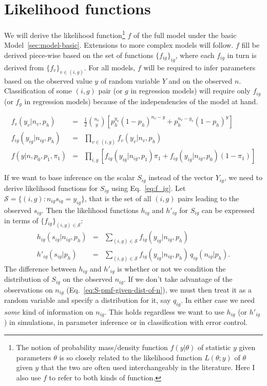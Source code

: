 \documentclass[letterpaper]{article}
\begin{document}
\section{Likelihood functions}

We will derive the likelihood function\footnote{The notion of probability
mass/density function \(f(y|\theta)\) of statistic \(y\) given parameters
\(\theta\) is so closely related to the likelihood function \(L(\theta; y)\)
of \(\theta\) given \(y\) that the two are often used interchangeably in the
literature.  Here I also use \(f\) to refer to both kinds of function.  }
\(f\) of the full model under the basic Model~\ref{sec:model-basic}.
Extensions to more complex models will follow.  \(f\) fill be derived
piece-wise based on the set of functions \(\{f_{ig}\}_{ig}\), where each
\(f_{ig}\) in turn is derived from \(\{f_v\}_{v\in(i,g)}\).  For all models,
\(f\) will be required to infer parameters based on the observed value \(y\)
of random variable \(Y\) and on the observed \(n\).  Classification of some
\((i,g)\) pair (or \(g\) in regression models) will require only \(f_{ig}\)
(or \(f_g\) in regression models) because of the independencies of the model
at hand.

\begin{eqnarray}
\label{eq:f_v}
f_v(y_v | n_v, p_h) &=& \frac{1}{2} \binom{n_v}{y} \left[
p_h^{y_v} (1 - p_h)^{n_v - y} + 
p_h^{n_v - y_v} (1 - p_h)^y \right] \\
\label{eq:f_ig}
f_{ig}(y_{ig} | n_{ig}, p_h) &=& \prod_{v\in(i,g)} f_v(y_v | n_v, p_h) \\
\label{eq:f}
f(y | n, p_0, p_1, \pi_1) &=& \prod_{i,g} \left[
f_{ig}(y_{ig} | n_{ig}, p_1) \pi_1 +
f_{ig}(y_{ig} | n_{ig}, p_0) (1-\pi_1)
\right]
\end{eqnarray}

If we want to base inference on the scalar \(S_{ig}\) instead of the vector
\(Y_{ig}\), we need to derive likelihood functions for \(S_{ig}\) using
Eq.~\ref{eq:f_ig}.
Let \(\mathcal{S} = \{(i,g) : n_{ig} s_{ig} = y_{ig}\}\), that is the set of
all \((i,g)\) pairs leading to the observed \(s_{ig}\).  Then the likelihood
functions \(h_{ig}\) and \(h'_{ig}\) for \(S_{ig}\) can be expressed in terms
of \(\{f_{ig}\}_{(i,g)\in\mathcal{S}}\):
\begin{eqnarray}
\label{eq:S-pmf-given-n}
h_{ig}(s_{ig} | n_{ig}, p_h) &=& \sum_{(i,g)\in\mathcal{S}} f_{ig}(y_{ig} | n_{ig}, p_h)
\\
\label{eq:S-pmf-given-dist-of-n}
h'_{ig}(s_{ig} | p_h) &=& \sum_{(i,g)\in\mathcal{S}} f_{ig}(y_{ig} | n_{ig},
p_h) \, q_{ig}(n_{ig}|p_h).
\end{eqnarray}
The difference between \(h_{ig}\) and \(h'_{ig}\) is whether or not we
condition the distribution of \(S_{ig}\) on the observed \(n_{ig}\).  If we
don't take advantage of the observations on \(n_{ig}\) (Eq.~\ref{eq:S-pmf-given-dist-of-n}), we
must then treat it as a random variable and specify a distribution for it, say
\(q_{ig}\). In either case we need \emph{some} kind of information on
\(n_{ig}\).  This holds regardless we want to use \(h_{ig}\) (or \(h'_{ig}\))
in simulations, in parameter inference or in classification with error
control.
\end{document}
